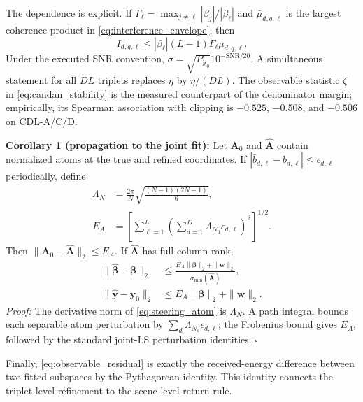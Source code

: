 The dependence is explicit. If $\Gamma_\ell=\max_{j\ne\ell}|\beta_j|/|\beta_\ell|$ and $\bar\mu_{d,q,\ell}$ is the largest coherence product in \eqref{eq:interference_envelope}, then
\begin{equation}
 I_{d,q,\ell}\le |\beta_\ell|(L-1)\Gamma_\ell\bar\mu_{d,q,\ell}.
 \label{eq:dynamic_range_interference}
\end{equation}
Under the executed SNR convention, $\sigma=\sqrt{P_{\mathcal Y_0}}10^{-\mathrm{SNR}/20}$. A simultaneous statement for all $DL$ triplets replaces $\eta$ by $\eta/(DL)$. The observable statistic $\zeta$ in \eqref{eq:candan_stability} is the measured counterpart of the denominator margin; empirically, its Spearman association with clipping is $-0.525$, $-0.508$, and $-0.506$ on CDL-A/C/D.

\textbf{Corollary 1 (propagation to the joint fit):}
Let $\mathbf A_0$ and $\widehat{\mathbf A}$ contain normalized atoms at the true and refined coordinates. If $|\widehat b_{d,\ell}-b_{d,\ell}|\le\epsilon_{d,\ell}$ periodically, define
\begin{equation}
\begin{aligned}
 \Lambda_N&=\frac{2\pi}{N}\sqrt{\frac{(N-1)(2N-1)}{6}},\\
 E_A&=\left[\sum_{\ell=1}^{L}\left(\sum_{d=1}^{D}
 \Lambda_{N_d}\epsilon_{d,\ell}\right)^2\right]^{1/2}.
\end{aligned}
 \label{eq:dictionary_lipschitz}
\end{equation}
Then $\|\mathbf A_0-\widehat{\mathbf A}\|_2\le E_A$. If $\widehat{\mathbf A}$ has full column rank,
\begin{align}
 \|\widehat{\boldsymbol\beta}-\boldsymbol\beta\|_2
 &\le\frac{E_A\|\boldsymbol\beta\|_2+\|\mathbf w\|_2}
 {\sigma_{\min}(\widehat{\mathbf A})},\nonumber\\
 \|\widehat{\mathbf y}-\mathbf y_0\|_2
 &\le E_A\|\boldsymbol\beta\|_2+\|\mathbf w\|_2.
 \label{eq:coordinate_to_ls_bound}
\end{align}
\emph{Proof:} The derivative norm of \eqref{eq:steering_atom} is $\Lambda_N$. A path integral bounds each separable atom perturbation by $\sum_d\Lambda_{N_d}\epsilon_{d,\ell}$; the Frobenius bound gives $E_A$, followed by the standard joint-LS perturbation identities. \hfill$\square$

Finally, \eqref{eq:observable_residual} is exactly the received-energy difference between two fitted subspaces by the Pythagorean identity. This identity connects the triplet-level refinement to the scene-level return rule.
